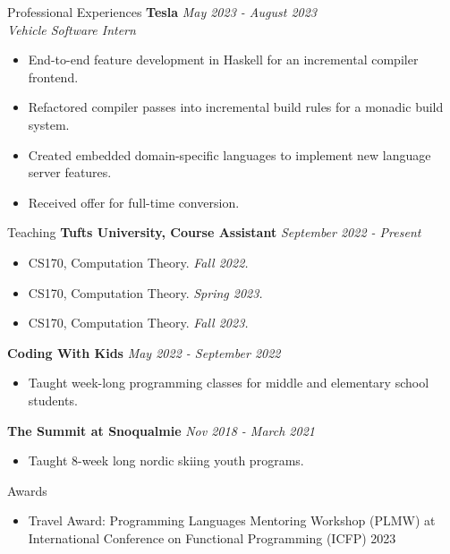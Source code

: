 \documentclass{resume} %
\begin{document}
\begin{rSection}{Professional Experiences}
{\bf Tesla} \hfill {\em May 2023 - August 2023}\\
\hfill {\it Vehicle Software Intern}
\begin{itemize}
    \item End-to-end feature development in Haskell for an incremental compiler frontend.
    \item Refactored compiler passes into incremental build rules for a monadic build system.
    \item Created embedded domain-specific languages to implement new language server features.
    \item Received offer for full-time conversion.
\end{itemize}
\end{rSection}

\begin{rSection}{Teaching}
{\bf Tufts University, Course Assistant} \hfill {\em September 2022 - Present}
\begin{itemize}
    \item CS170, Computation Theory. {\it Fall 2022.}
    \item CS170, Computation Theory. {\it Spring 2023.}
    \item CS170, Computation Theory. {\it Fall 2023.}
\end{itemize}

{\bf Coding With Kids} \hfill {\em May 2022 - September 2022}
\begin{itemize}
    \item Taught week-long programming classes for middle and elementary school students.
\end{itemize}

{\bf The Summit at Snoqualmie} \hfill {\em Nov 2018 - March 2021}
\begin{itemize}
    \item Taught 8-week long nordic skiing youth programs.
\end{itemize}
    
\end{rSection}

\begin{rSection}{Awards}
    \begin{itemize}
        \item Travel Award: Programming Languages Mentoring Workshop (PLMW) at International Conference on Functional Programming (ICFP) 2023
    \end{itemize}
\end{rSection}
\end{document}
